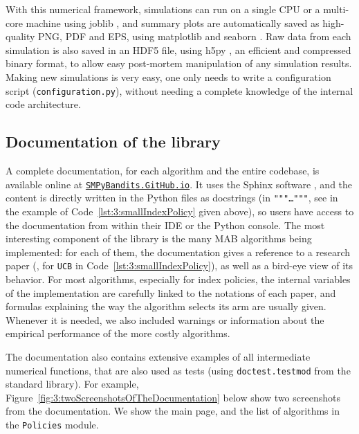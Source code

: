 With this numerical framework, simulations can run on a single CPU or a multi-core machine using joblib \cite{joblib},
and summary plots are automatically saved as high-quality PNG, PDF and EPS, using matplotlib \cite{matplotlib} and seaborn \cite{seaborn}.
Raw data from each simulation is also saved in an HDF5 file, using h5py \cite{h5py}, an efficient and compressed binary format, to allow easy post-mortem manipulation of any simulation results.
Making new simulations is very easy, one only needs to write a configuration script (\texttt{configuration.py}), without needing a complete knowledge of the internal code architecture.


\subsection{Documentation of the library}

A complete documentation, for each algorithm and the entire codebase, is available online at
\texttt{\href{https://SMPyBandits.GitHub.io}{SMPyBandits.GitHub.io}}.
It uses the Sphinx software \cite{sphinx}, and the content is directly written in the Python files as docstrings (in \texttt{"""\dots"""}, see in the example of Code~\ref{lst:3:smallIndexPolicy} given above), so users have access to the documentation from within their IDE or the Python console.
The most interesting component of the library is the many MAB algorithms being implemented: for each of them, the documentation gives a reference to a research paper (\eg, \cite{Auer02} for \texttt{UCB} in Code~\ref{lst:3:smallIndexPolicy}), as well as a bird-eye view of its behavior.
For most algorithms, especially for index policies, the internal variables of the implementation are carefully linked to the notations of each paper, and formulas explaining the way the algorithm selects its arm are usually given.
Whenever it is needed, we also included warnings or information about the empirical performance of the more costly algorithms.

The documentation also contains extensive examples of all intermediate numerical functions, that are also used as tests (using \texttt{doctest.testmod} from the standard library).
For example, Figure~\ref{fig:3:twoScreenshotsOfTheDocumentation} below show two screenshots from the documentation.
We show the main page, and the list of algorithms in the \texttt{Policies} module.


